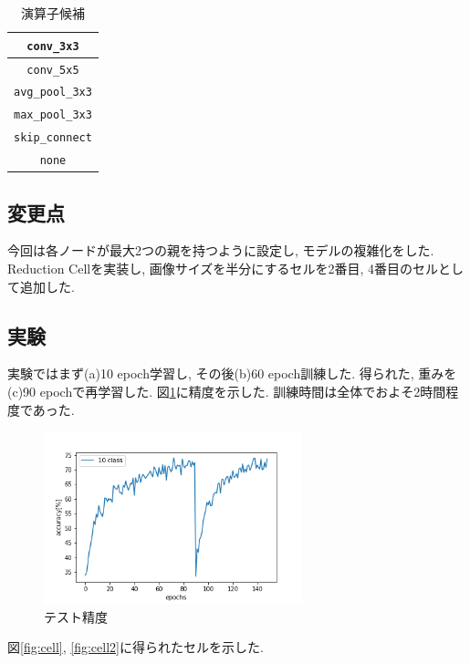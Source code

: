 \documentclass[twocolumn]{jarticle}     %
\begin{document}
\begin{table}[tb]
  \begin{center}
    \caption{演算子候補}
    \begin{tabular}{|c|} \hline
      \verb|conv_3x3| \\ \hline
      \verb|conv_5x5| \\ \hline
      \verb|avg_pool_3x3| \\ \hline
      \verb|max_pool_3x3| \\ \hline
      \verb|skip_connect| \\ \hline
      \verb|none| \\ \hline
    \end{tabular}
    \label{tab:ops}
  \end{center}
\end{table}

\subsection{変更点}
今回は各ノードが最大2つの親を持つように設定し, モデルの複雑化をした.
Reduction Cellを実装し, 画像サイズを半分にするセルを2番目, 4番目のセルとして追加した.

\subsection{実験}
実験ではまず(a)10 epoch学習し,
その後(b)60 epoch訓練した.
得られた, 重みを(c)90 epochで再学習した.
図\ref{fig:acc}に精度を示した.
訓練時間は全体でおよそ2時間程度であった.

\begin{figure}[tb]
	\begin{center}
		\includegraphics[clip,width=7.5cm]{accuracy.png}
		\caption{テスト精度}
		\label{fig:acc}
	\end{center}
\end{figure}

図\ref{fig:cell}, \ref{fig:cell2}に得られたセルを示した.
\end{document}
